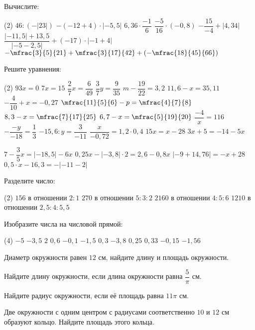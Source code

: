 \begin{class}[number=5-6]
	\begin{listofex}
		\item Вычислите: %
		\begin{tasks}(2)
			\task \( 46 : (-|23|) \)
			\task \( -(-12 + 4) \cdot |-5,5| \)
			\task \( 6,36 \cdot \dfrac{-1}{6} \)
			\task \( \dfrac{-5}{16} \cdot (-0,8) \)
			\task \( -\dfrac{15}{-4} + |4,34| \)
			\task \( \dfrac{|-11,5| + 13,5}{|-5 - 2,5|} + (-17)\cdot |-1+4| \)
			\task \( -\mfrac{3}{5}{21}+\mfrac{3}{17}{42}+\left(-\mfrac{18}{45}{66} \right) \)
		\end{tasks}
		\item Решите уравнения:
		\begin{tasks}(2)
			\task \( 93x=0 \)
			\task \( 7x=15 \)
			\task \( \dfrac{2}{7}x=\dfrac{6}{49} \)
			\task \( \dfrac{3}{7}y=\dfrac{9}{35} \)
			\task \( m-\dfrac{19}{22}=3,2 \)
			\task \( 11,6-x=35,11 \)
			\task \( -\dfrac{4}{10}+x=-0,27 \)
			\task \( \mfrac{11}{5}{6}-p=\mfrac{4}{7}{8} \)
			\task \( 8,3-x=\mfrac{7}{17}{25} \)
			\task \( 6,7-x=\mfrac{5}{19}{20} \)
			\task \( \dfrac{-4}{x}=116 \)
			\task \( -\dfrac{-y}{-18}=\dfrac{1}{3} \)
			\task \( -15,6:y=\dfrac{3}{-11} \)
			\task \( \dfrac{x}{-0,72}=1,2 \cdot 0,4 \)
			\task \( 15x=x-28 \)
			\task \( 3x+5=-14-5x \)
			
			\task \( 7-\dfrac{3}{5}x=|-18,5|-6x \)
			\task \( 0,25x-|-3,8| \cdot 2 = 2,6 - 0,8x \)
			\task \( |-9 + 14,76| = -x+28 \)
			\task \( 0,5 \cdot x-16,3=- |-11-2| \)
		\end{tasks}
		\item Разделите число:
		\begin{tasks}(2)
			\task \( 156 \) в отношении \( 2:1 \)
			\task \( 270 \) в отношении \( 5:3:2 \)
			\task \( 2160 \) в отношении \( 4:5:6 \)
			\task \( 1210 \) в отношении \( 2,5:4:5,5 \)
		\end{tasks}
		\item Изобразите числа на числовой прямой:
		\begin{tasks}(4)
			\task \( -5 \)
			\task \( -3,5 \)
			\task \( 2 \)
			\task \( 0,6 \)
			\task \( -0,1 \)
			\task \( -1,5 \)
			\task \( 0,3 \)
			\task \( -3,8 \)
			\task \( 0,25 \)
			\task \( 0,33 \)
			\task \( -0,15 \)
			\task \( -1,56 \)
		\end{tasks}
		\item Диаметр окружности равен \(12\) см, найдите длину и площадь окружности.
		\item Найдите длину окружности, если длина окружности равна \(\dfrac{ 5 }{ \pi }\) см.
		\item Найдите радиус окружности, если её площадь равна \( 11\pi \) см.
		\item Две окружности с одним центром с радиусами соответственно \( 10\) и \(12\) см образуют кольцо. Найдите площадь этого кольца.
	\end{listofex}
\end{class}


